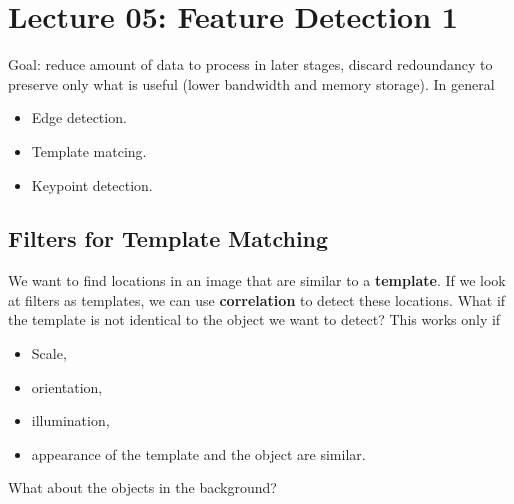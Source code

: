 \documentclass[a4paper,12 pt]{article}
\theoremstyle{definition}
\theoremstyle{remark}
\theoremstyle{definition}
\theoremstyle{definition}
\theoremstyle{definition}
\theoremstyle{remark}
\theoremstyle{definition}
\begin{document}
\section*{Lecture 05: Feature Detection 1}
Goal: reduce amount of data to process in later stages, discard redoundancy to preserve only what is useful (lower bandwidth and memory storage). In general
\begin{itemize}
\item Edge detection.
\item Template matcing.
\item Keypoint detection.
\end{itemize}
\subsection*{Filters for Template Matching}
We want to find locations in an image that are similar to a \textbf{template}. If we look at filters as templates, we can use \textbf{correlation} to detect these locations. What if the template is not identical to the object we want to detect? This works only if
\begin{itemize}
\item Scale,
\item orientation,
\item illumination,
\item appearance of the template and the object are similar.
\end{itemize}
What about the objects in the background?
\end{document}
